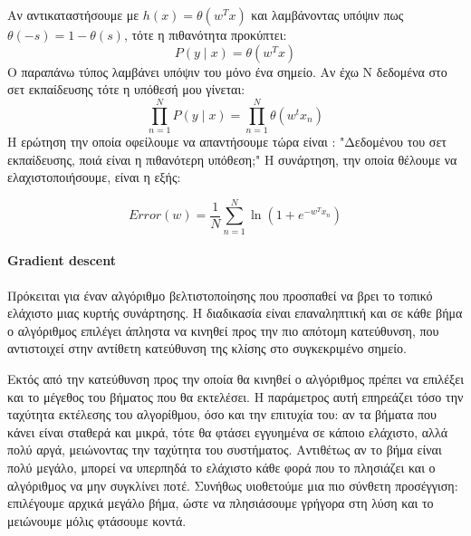 Αν αντικαταστήσουμε με $h(x)=\theta(w^T x)$ και λαμβάνοντας υπόψιν πως $\theta(-s)= 1 - \theta(s)$, τότε η πιθανότητα  προκύπτει:
\begin{equation}
P(y \mid x)= \theta(w^T x)
\end{equation}
Ο παραπάνω τύπος λαμβάνει υπόψιν του μόνο ένα σημείο. Αν έχω N δεδομένα στο σετ εκπαίδευσης τότε η υπόθεσή μου γίνεται:
\begin{equation}
\prod_{n=1}^{N} P(y \mid x)= \prod_{n=1}^{N} \theta (w^t x_n)
\end{equation}
Η ερώτηση την οποία οφείλουμε να απαντήσουμε τώρα είναι : "Δεδομένου του σετ εκπαίδευσης, ποιά είναι η πιθανότερη υπόθεση;" Η συνάρτηση, την οποία θέλουμε να ελαχιστοποιήσουμε, είναι η εξής:

\begin{equation}
Error(w)= \frac{1}{N} \sum_{n=1}^{N} \ln (1 + e^{- w^T x_n} )
\end{equation}

\paragraph{Gradient descent} Πρόκειται για έναν αλγόριθμο βελτιστοποίησης που προσπαθεί να βρει το τοπικό ελάχιστο μιας κυρτής συνάρτησης. Η διαδικασία είναι επαναληπτική και σε κάθε βήμα ο αλγόριθμος επιλέγει άπληστα να κινηθεί προς την πιο απότομη κατεύθυνση, που αντιστοιχεί στην αντίθετη κατεύθυνση της κλίσης στο συγκεκριμένο σημείο.

Εκτός από την κατεύθυνση προς την οποία θα κινηθεί ο αλγόριθμος πρέπει να επιλέξει και το μέγεθος του βήματος που θα εκτελέσει. Η παράμετρος αυτή επηρεάζει τόσο την ταχύτητα εκτέλεσης του αλγορίθμου, όσο και την επιτυχία του: αν τα βήματα που κάνει είναι σταθερά και μικρά, τότε θα φτάσει εγγυημένα σε κάποιο ελάχιστο, αλλά πολύ αργά, μειώνοντας την ταχύτητα του συστήματος. Αντιθέτως αν το βήμα είναι πολύ μεγάλο, μπορεί να υπερπηδά το ελάχιστο κάθε φορά που το πλησιάζει και ο αλγόριθμος να μην συγκλίνει ποτέ. Συνήθως υιοθετούμε μια πιο σύνθετη προσέγγιση: επιλέγουμε αρχικά μεγάλο βήμα, ώστε να πλησιάσουμε γρήγορα στη λύση και το μειώνουμε μόλις φτάσουμε κοντά.
